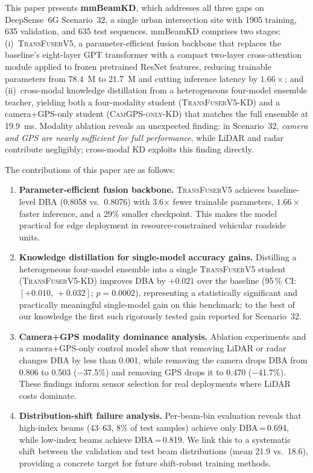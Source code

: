 \documentclass[journal,10pt,twoside]{IEEEtran}
\newcommand{\ours}{\textsc{TransFuserV5}}
\newcommand{\distill}{\textsc{TransFuserV5-KD}}
\begin{document}
This paper presents \textbf{mmBeamKD}, which addresses all three gaps on
DeepSense~6G Scenario~32, a single urban intersection site with 1905 training,
635 validation, and 635 test sequences.
mmBeamKD comprises two stages: (i)~\ours{}, a parameter-efficient fusion backbone
that replaces the baseline's eight-layer GPT transformer with a compact two-layer
cross-attention module applied to frozen pretrained ResNet features, reducing
trainable parameters from 78.4~M to 21.7~M and cutting inference latency by
$1.66\times$; and (ii)~cross-modal knowledge distillation from a heterogeneous
four-model ensemble teacher, yielding both a four-modality student (\distill{})
and a camera+GPS-only student (\textsc{CamGPS-only-KD}) that matches the full
ensemble at 19.9~ms. Modality ablation reveals an unexpected finding: in
Scenario~32, \emph{camera and GPS are nearly sufficient for full performance},
while LiDAR and radar contribute negligibly; cross-modal KD exploits this finding directly.

The contributions of this paper are as follows:

\begin{enumerate}
\item \textbf{Parameter-efficient fusion backbone.}
    \ours{} achieves baseline-level DBA (0.8058 vs.\ 0.8076) with 3.6$\times$
    fewer trainable parameters, $1.66\times$ faster inference, and a 29\%
    smaller checkpoint. This makes the model practical for edge deployment in
    resource-constrained vehicular roadside units.

\item \textbf{Knowledge distillation for single-model accuracy gains.}
    Distilling a heterogeneous four-model ensemble into a single \ours{}
    student (\distill{}) improves DBA by $+0.021$ over the baseline
    (95\,\% CI: $[+0.010,\,+0.032]$; $p=0.0002$), representing a
    statistically significant and practically meaningful single-model
    gain on this benchmark; to the best of our knowledge the first such
    rigorously tested gain reported for Scenario~32.

\item \textbf{Camera+GPS modality dominance analysis.}
    Ablation experiments and a camera+GPS-only control model show that removing
    LiDAR or radar changes DBA by less than 0.001, while removing the camera
    drops DBA from 0.806 to 0.503 ($-$37.5\%) and removing GPS drops it to
    0.470 ($-$41.7\%). These findings inform sensor selection for real
    deployments where LiDAR costs dominate.

\item \textbf{Distribution-shift failure analysis.}
    Per-beam-bin evaluation reveals that high-index beams (43--63, 8\% of test
    samples) achieve only DBA\,=\,0.694, while low-index beams achieve
    DBA\,=\,0.819. We link this to a systematic shift between the validation
    and test beam distributions (mean 21.9 vs.\ 18.6), providing a concrete
    target for future shift-robust training methods.
\end{enumerate}
\end{document}
